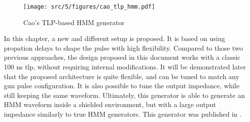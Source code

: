 \begin{figure}[!h]
  \centering
  \texttt{[image: src/5/figures/cao\_tlp\_hmm.pdf]}
  \caption{Cao's TLP-based HMM generator}
  \label{fig:cao_tlp_hmm}
\end{figure}

In this chapter, a new and different setup is proposed.
It is based on using propation delays to shape the pulse with high flexibility.
Compared to those two previous approaches, the design proposed in this document works with a classic 100 ns \gls{tlp}, without requiring internal modifications.
It will be demonstrated later that the proposed architecture is quite flexible, and can be tuned to match any gun pulse configuration.
It is also possible to tune the output impedance, while still keeping the same waveform.
Ultimately, this generator is able to generate an HMM waveform inside a shielded environment, but with a large output impedance similarly to true HMM generators.
This generator was published in \cite{my-publi-tlp-hmm}.
